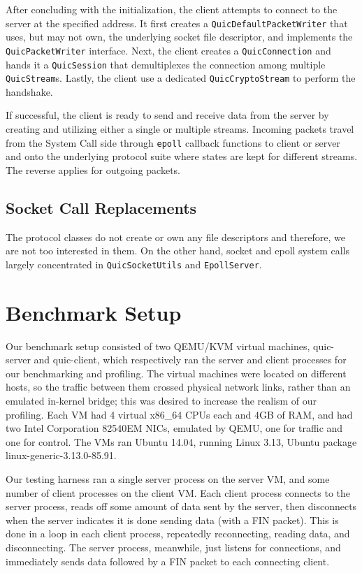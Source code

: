 \documentclass{sig-alternate-05-2015}
\begin{document}
After concluding with the initialization, the client attempts to connect to the server at the specified address. It first creates a                   \texttt{QuicDefaultPacketWriter} that uses, but may not own, the underlying socket file descriptor, and implements the \texttt{QuicPacketWriter} interface. Next, the client creates a \texttt{QuicConnection} and hands it a \texttt{QuicSession} that demultiplexes the connection among multiple \texttt{QuicStream}s. Lastly, the client use a dedicated \texttt{QuicCryptoStream} to perform the handshake.

If successful, the client is ready to send and receive data from the server by creating and utilizing either a single or multiple streams. Incoming packets travel from the System Call side through \texttt{epoll} callback functions to client or server and onto the underlying protocol suite where states are kept for different streams. The reverse applies for outgoing packets.

\subsection{Socket Call Replacements}
The protocol classes do not create or own any file descriptors and therefore, we are not too interested in them. On the other hand, socket and epoll system calls largely concentrated in \texttt{QuicSocketUtils} and \texttt{EpollServer}. 


\section{Benchmark Setup}
Our benchmark setup consisted of two QEMU/KVM virtual machines,
quic-server and quic-client,
which respectively ran the server and client processes for our benchmarking and profiling.
The virtual machines were located on different hosts,
so the traffic between them crossed physical network links, rather than an emulated in-kernel bridge;
this was desired to increase the realism of our profiling.
Each VM had 4 virtual x86\_64 CPUs each and 4GB of RAM,
and had two Intel Corporation 82540EM NICs, emulated by QEMU,
one for traffic and one for control.
The VMs ran Ubuntu 14.04,
running Linux 3.13,
Ubuntu package linux-generic-3.13.0-85.91.

Our testing harness ran a single server process on the server VM,
and some number of client processes on the client VM.
Each client process connects to the server process,
reads off some amount of data sent by the server,
then disconnects when the server indicates it is done sending data (with a FIN packet).
This is done in a loop in each client process, repeatedly reconnecting, reading data, and disconnecting.
The server process, meanwhile, just listens for connections, and immediately sends data followed by a FIN packet to each connecting client.
\end{document}
